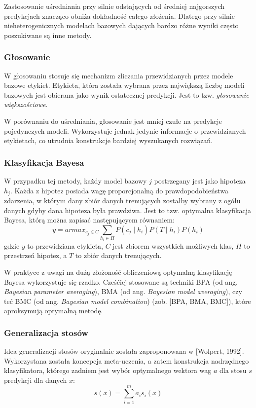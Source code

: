 Zastosowanie uśredniania przy silnie odstających od średniej najgorszych predykcjach znacząco obniża dokładność całego złożenia. Dlatego przy silnie nieheterogenicznych modelach bazowych dających bardzo różne wyniki często poszukiwane są inne metody.

\subsubsection{Głosowanie}

W głosowaniu stosuje się mechanizm zliczania przewidzianych przez modele bazowe etykiet. Etykieta, która została wybrana przez największą liczbę modeli bazowych jest obierana jako wynik ostatecznej predykcji. Jest to tzw. \textit{głosowanie większościowe}.

W porównaniu do uśredniania, głosowanie jest mniej czułe na predykcje pojedynczych modeli. Wykorzystuje jednak jedynie informacje o przewidzianych etykietach, co utrudnia konstrukcje bardziej wyszukanych rozwiązań.

\subsubsection{Klasyfikacja Bayesa}

W przypadku tej metody, każdy model bazowy $j$ postrzegany jest jako hipoteza $h_j$. Każda z hipotez posiada wagę proporcjonalną do prawdopodobieństwa zdarzenia, w którym dany zbiór danych trenujących zostałby wybrany z ogółu danych gdyby dana hipoteza była prawdziwa. Jest to tzw. optymalna klasyfikacja Bayesa, którą można zapisać następującycm równaniem:
\begin{equation}
y = armax_{c_j \in C} \sum_{h_i \in H} P(c_j \mid h_i)P(T \mid h_i)P(h_i)
\end{equation}
gdzie $y$ to przewidziana etykieta, $C$ jest zbiorem wszystkich możliwych klas, $H$ to przestrzeń hipotez, a $T$ to zbiór danych trenujących.

W praktyce z uwagi na dużą złożoność obliczeniową optymalną klasyfikację Bayesa wykorzystuje się rzadko. Cześćiej stosowane są techniki BPA (od ang. \textit{Bayesian parameter averaging}), BMA (od ang. \textit{Bayesian model averaging}), czy teć BMC (od ang. \textit{Bayesian model combination}) (zob. [BPA, BMA, BMC]), które aproksymują optymalną metodę.

\subsubsection{Generalizacja stosów}
Idea generalizacji stosów oryginalnie została zaproponowana w [Wolpert, 1992]. Wykorzystana została koncepcja meta-uczenia, a zatem konstrukcja nadrzędnego klasyfikatora, którego zadniem jest wybór optymalnego wektora wag $a$ dla stosu $s$ predykcji dla danych $x$:
\begin{equation}
s(x) = \sum_{i=1}^{m}a_i s_i(x)
\end{equation}

